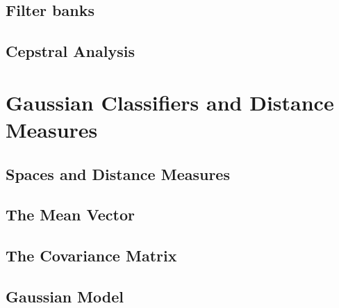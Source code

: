 \subsection{Filter banks}
\label{sub:Filter banks}

\subsection{Cepstral Analysis}
\label{sub:Cepstral Analysis}


\section{Gaussian Classifiers and Distance Measures}
\label{sec:Gaussian Classifiers and Distance Measures}

\subsection{Spaces and Distance Measures}
\label{sub:Spaces and Distance Measures}

\subsection{The Mean Vector}
\label{sub:The Mean Vector}

\subsection{The Covariance Matrix}
\label{sub:The Covariance Matrix}

\subsection{Gaussian Model}
\label{sub:Gaussian Model}

